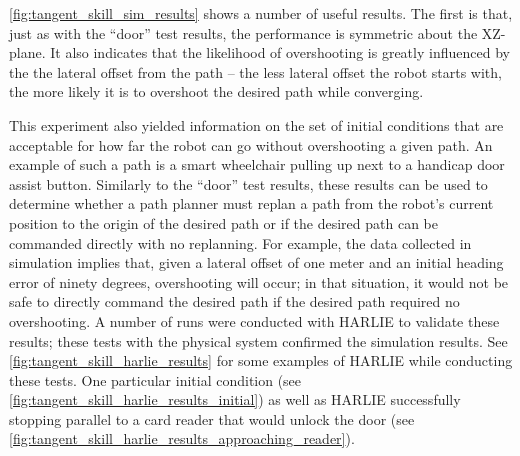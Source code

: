 \autoref{fig:tangent_skill_sim_results} shows a number of useful results. The first is that, just as with the ``door'' test results, the performance is symmetric about the XZ-plane. It also indicates that the likelihood of overshooting is greatly influenced by the the lateral offset from the path -- the less lateral offset the robot starts with, the more likely it is to overshoot the desired path while converging.

This experiment also yielded information on the set of initial conditions that are acceptable for how far the robot can go without overshooting a given path. An example of such a path is a smart wheelchair pulling up next to a handicap door assist button. Similarly to the ``door'' test results, these results can be used to determine whether a path planner must replan a path from the robot's current position to the origin of the desired path or if the desired path can be commanded directly with no replanning. For example, the data collected in simulation implies that, given a lateral offset of one meter and an initial heading error of ninety degrees, overshooting will occur; in that situation, it would not be safe to directly command the desired path if the desired path required no overshooting. A number of runs were conducted with HARLIE to validate these results; these tests with the physical system confirmed the simulation results. See \autoref{fig:tangent_skill_harlie_results} for some examples of HARLIE while conducting these tests. One particular initial condition (see \autoref{fig:tangent_skill_harlie_results_initial}) as well as HARLIE successfully stopping parallel to a card reader that would unlock the door (see \autoref{fig:tangent_skill_harlie_results_approaching_reader}).

